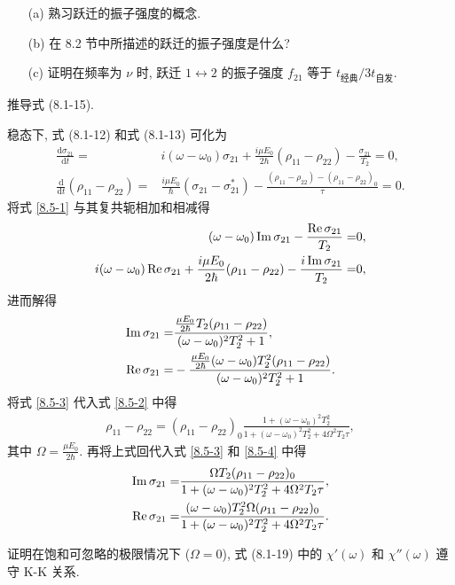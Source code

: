 \documentclass{note}
\begin{document}
\begin{exe}
    \begin{itemize}
        \item[(a)] 熟习跃迁的振子强度的概念.
        \item[(b)] 在 8.2 节中所描述的跃迁的振子强度是什么?
        \item[(c)] 证明在频率为 $\nu$ 时, 跃迁 $1\leftrightarrow 2$ 的振子强度 $f_{21}$ 等于 $t_{\text{经典}}/3t_{\text{自发}}$.
    \end{itemize}
\end{exe}
\begin{sol}
    
\end{sol}

\begin{exe}
    推导式 (8.1-15).
\end{exe}
\begin{pf}
    稳态下, 式 (8.1-12) 和式 (8.1-13) 可化为
    \begin{align}
        \label{8.5-1}
        \frac{\mathrm{d}\sigma_{21}}{\mathrm{d}t}=&i(\omega-\omega_0)\sigma_{21}+\frac{i\mu E_0}{2\hbar}(\rho_{11}-\rho_{22})-\frac{\sigma_{21}}{T_2}=0,\\
        \label{8.5-2}
        \frac{\mathrm{d}}{\mathrm{d}t}(\rho_{11}-\rho_{22})=&\frac{i\mu E_0}{\hbar}(\sigma_{21}-\sigma_{21}^*)-\frac{(\rho_{11}-\rho_{22})-(\rho_{11}-\rho_{22})_0}{\tau}=0.
    \end{align}
    将式 \eqref{8.5-1} 与其复共轭相加和相减得
    \begin{align}
        (\omega-\omega_0)\operatorname{Im}\sigma_{21}-\frac{\operatorname{Re}\sigma_{21}}{T_2}=&0,\\
        i(\omega-\omega_0)\operatorname{Re}\sigma_{21}+\frac{i\mu E_0}{2\hbar}(\rho_{11}-\rho_{22})-\frac{i\operatorname{Im}\sigma_{21}}{T_2}=&0,
    \end{align}
    进而解得
    \begin{align}
        \label{8.5-3}
        \operatorname{Im}\sigma_{21}=&\frac{\frac{\mu E_0}{2\hbar}T_2(\rho_{11}-\rho_{22})}{(\omega-\omega_0)^2T_2^2+1},\\
        \label{8.5-4}
        \operatorname{Re}\sigma_{21}=&-\frac{\frac{\mu E_0}{2\hbar}(\omega-\omega_0)T_2^2(\rho_{11}-\rho_{22})}{(\omega-\omega_0)^2T_2^2+1}.
    \end{align}
    将式 \eqref{8.5-3} 代入式 \eqref{8.5-2} 中得
    \begin{align}
        \rho_{11}-\rho_{22}=(\rho_{11}-\rho_{22})_0\frac{1+(\omega-\omega_0)^2T_2^2}{1+(\omega-\omega_0)^2T_2^2+4\Omega^2T_2\tau},
    \end{align}
    其中 $\Omega=\frac{\mu E_0}{2\hbar}$.
    再将上式回代入式 \eqref{8.5-3} 和 \eqref{8.5-4} 中得
    \begin{align}
        \operatorname{Im}\sigma_{21}=&\frac{\Omega T_2(\rho_{11}-\rho_{22})_0}{1+(\omega-\omega_0)^2T_2^2+4\Omega^2T_2\tau},\\
        \operatorname{Re}\sigma_{21}=&\frac{(\omega-\omega_0)T_2^2\Omega(\rho_{11}-\rho_{22})_0}{1+(\omega-\omega_0)^2T_2^2+4\Omega^2T_2\tau}.
    \end{align}
\end{pf}

\begin{exe}
    证明在饱和可忽略的极限情况下 ($\Omega=0$), 式 (8.1-19) 中的 $\chi'(\omega)$ 和 $\chi''(\omega)$ 遵守 K-K 关系.
\end{exe}
\begin{pf}
    
\end{pf}
\ifx\allfiles\undefined
\end{document}
